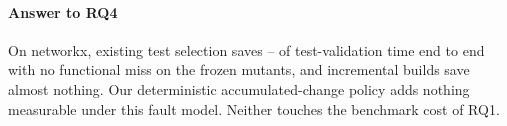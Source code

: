 \paragraph*{Answer to RQ4}
On networkx, existing test selection saves \TestmonRatioLo--\TestmonRatioHi\x{} of test-validation time end to end with no functional miss on the frozen mutants, and incremental builds save almost nothing.
Our deterministic accumulated-change policy adds nothing measurable under this fault model.
Neither touches the benchmark cost of RQ1.

